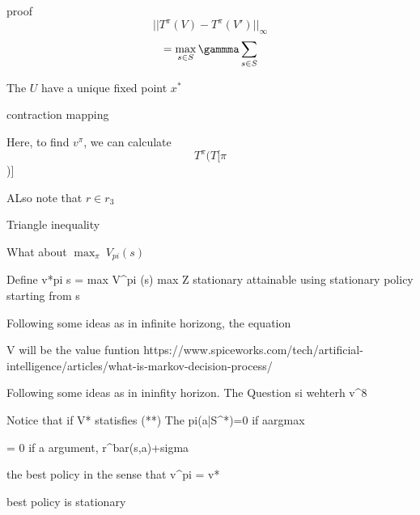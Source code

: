\documentclass[11pt]{article}
\begin{document}
proof
    \[||{T}^{\pi}({V})-{T}^{\pi}({V'})||_{\infty}\]
    \[= \max_{s \in S} {\gammma} \sum_{s \in S}\]

    The \(U\) have a unique fixed point \({x}^{*}\)

contraction mapping

    Here, to find \({v}^{\pi}\),  we can calculate \[{T}^{\pi}({T}[\pi\])]\]

ALso note that \({r \in {r}_{3}}\)


    Triangle inequality


    What about \(\max_{\pi}\ {V}_{pi}(s)\)

    Define v*pi s = max V^pi (s) max Z stationary
    attainable using stationary
    policy starting from s


    Following some ideas as in infinite horizong, the equation

    V will be the value funtion
    https://www.spiceworks.com/tech/artificial-intelligence/articles/what-is-markov-decision-process/

    Following some ideas as in ininfity horizon. The Question si wehterh v^8

    Notice that if V* statisfies (**)
    The pi(a|S^*)=0 if a\notin argmax

    = 0 if a \notin argument,  r^bar(s,a)+sigma


    the best policy in the sense that v^pi = v*


    best policy is stationary
\end{document}
